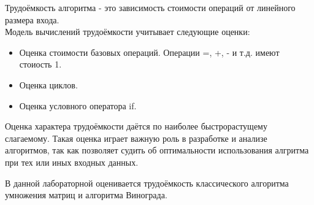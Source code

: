 Трудоёмкость алгоритма - это зависимость стоимости операций от линейного размера входа\cite{perf_def}.\\
Модель вычислений трудоёмкости учитывает следующие оценки:
\begin{itemize}
	\item Оценка стоимости базовых операций. Операции =, +, - и т.д. имеют стоиость 1.
	\item Оценка циклов.
	\item Оценка условного оператора if.
\end{itemize}

Оценка характера трудоёмкости даётся по наиболее быстрорастущему слагаемому. Такая оценка играет важную роль в 
разработке и анализе алгоритмов, так как позволяет судить об оптимальности использования алгритма при тех или
иных входных данных.

В данной лабораторной оценивается трудоёмкость классического алгоритма умножения матриц и алгоритма Винограда. 
